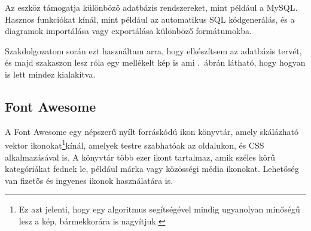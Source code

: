 \documentclass[
]{thesis-ekf}
\theoremstyle{definition}
\theoremstyle{remark}
\begin{document}
	Az eszköz támogatja különböző adatbázis rendszereket, mint például a MySQL. Hasznos funkciókat kínál, mint például az automatikus SQL kódgenerálás, és a diagramok importálása vagy exportálása különböző formátumokba.\cite{dbdiagram-io}
	
	Szakdolgozatom során ezt használtam arra, hogy elkészítsem az adatbázis tervét, és majd  szakaszon lesz róla egy mellékelt kép is ami .~ábrán látható, hogy hogyan is lett mindez kialakítva.
	
	\subsection{Font Awesome}
	A Font Awesome egy népszerű nyílt forráskódú ikon könyvtár, amely skálázható vektor ikonokat\footnote{Ez azt jelenti, hogy egy algoritmus segítségével mindig ugyanolyan minőségű lesz a kép, bármekkorára is nagyítjuk.}kínál, amelyek testre szabhatóak az oldalukon, és CSS alkalmazásával is. A könyvtár több ezer ikont tartalmaz, amik széles körű kategóriákat fednek le, például márka vagy közösségi média ikonokat. Lehetőség van fizetős és ingyenes ikonok használatára is.
	
\end{document}
